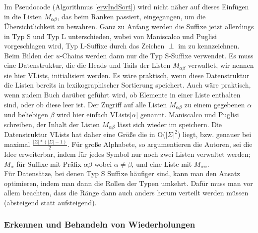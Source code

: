Im Pseudocode (Algorithmus \ref{erwIndSort}) wird nicht näher auf dieses Einfügen in die Listen $M_{\alpha\beta}$, das beim Ranken passiert, eingegangen, um die Übersichtlichkeit zu bewahren. Ganz zu Anfang werden die Suffixe jetzt allerdings in Typ S und Typ L unterschieden, wobei von Maniscalco und Puglisi vorgeschlagen wird, Typ L-Suffixe durch das Zeichen $\perp$ im \isa zu kennzeichnen. Beim Bilden der $u$-Chains werden dann nur die Typ S-Suffixe verwendet. Es muss eine Datenstruktur, die die Heads und Tails der Listen $M_{\alpha\beta}$ verwaltet, wir nennen sie hier VLists, initialisiert werden. Es wäre praktisch, wenn diese Datenstruktur die Listen bereits in lexikographischer Sortierung speichert. Auch wäre praktisch, wenn zudem Buch darüber geführt wird, ob Elemente in einer Liste enthalten sind, oder ob diese leer ist. Der Zugriff auf alle Listen $M_{\alpha\beta}$ zu einem gegebenen $\alpha$ und beliebigen $\beta$ wird hier einfach VLists[$\alpha$] genannt.
Maniscalco und Puglisi schreiben, der Inhalt der Listen $M_{\alpha\beta}$ lässt sich wieder im \isa speichern. Die Datenstruktur VLists hat daher eine Größe die in O($|\Sigma|^2$) liegt, bzw. genauer bei maximal $\frac{|\Sigma|*(|\Sigma|-1)}{2}$.
Für große Alphabete, so argumentieren die Autoren, sei die Idee erweiterbar, indem für jedes Symbol nur noch zwei Listen verwaltet werden; $M_\alpha$ für Suffixe mit Präfix $\alpha\beta$ wobei $\alpha \neq \beta$, und eine Liste mit $M_{\alpha\alpha}$.\\
Für Datensätze, bei denen Typ S Suffixe häufiger sind, kann man den Ansatz optimieren, indem man dann die Rollen der Typen umkehrt. Dafür muss man vor allem beachten, dass die Ränge dann auch anders herum verteilt werden müssen (absteigend statt aufsteigend).

\subsubsection{Erkennen und Behandeln von Wiederholungen}

